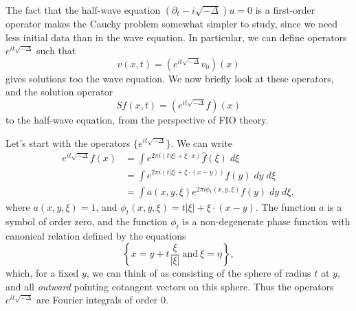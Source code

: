 \documentclass{article}
\theoremstyle{plain}
\theoremstyle{remark}
\theoremstyle{definition}
\begin{document}
The fact that the half-wave equation $(\partial_t - i \sqrt{-\Delta}) u = 0$ is a first-order operator makes the Cauchy problem somewhat simpler to study, since we need less initial data than in the wave equation. In particular, we can define operators $e^{it \sqrt{-\Delta}}$ such that
%
\[ v(x,t) = (e^{i t \sqrt{-\Delta}} v_0)(x) \]
%
gives solutions too the wave equation. We now briefly look at these operators, and the solution operator
%
\[ Sf(x,t) = (e^{i t \sqrt{-\Delta}} f)(x) \]
%
to the half-wave equation, from the perspective of FIO theory.

\begin{comment}

Fourier transform of e^{-|x|} is

	c_d (1 + |xi|^2)^{- (d+1) / 2}

Fourier transform of e^{- lambda |x|} for lambda > 0 is

	int e^{- lambda |x|} e^{-i xi * x} dx
	= c_d lambda^{-d} (1 + |xi|^2 / lambda^2)^{-(d+1)/2}

Can we now apply analytic continuation to conclude that
the Fourier transform of e^{-it |x|} is equal to

	c_d (it)^{-d} ( 1 + |xi|^2 / (it + 0)^2 )^{-(d+1)/2}

where we take the branch of the square root that is the analytic extension
away of the normal square root away, defined away from the imaginary axis.

Then for |xi| > t this quantity is equal to

	c_d i t^{-d} ( |xi|^2 / t^2 - 1 )^{-(d+1)/2}

e^{-i pi / 2}

sqrt( a e^{it} ) = sqrt(a) sqrt(e^{it/2})

\end{comment}

Let's start with the operators $\{ e^{it \sqrt{-\Delta}} \}$. We can write
%
\begin{align*}
	e^{i t \sqrt{-\Delta}} f(x) &= \int e^{2 \pi i (t |\xi| + \xi \cdot x)} \widehat{f}(\xi)\; d\xi\\
	&= \int e^{2 \pi i (t |\xi| + \xi \cdot (x - y))} f(y)\; dy\; d\xi\\
	&= \int a(x,y,\xi) e^{2 \pi i \phi_t(x,y,\xi)} f(y)\; dy\; d\xi,
\end{align*}
%
where $a(x,y,\xi) = 1$, and $\phi_t(x,y,\xi) = t |\xi| + \xi \cdot (x - y)$. The function $a$ is a symbol of order zero, and the function $\phi_t$ is a non-degenerate phase function with canonical relation defined by the equations
%
\[ \left\{ x = y + t \frac{\xi}{|\xi|}\ \text{and}\ \xi = \eta \right\}, \]
%
which, for a fixed $y$, we can think of as consisting of the sphere of radius $t$ at $y$, and all \emph{outward} pointing cotangent vectors on this sphere. Thus the operators $e^{it \sqrt{-\Delta}}$ are Fourier integrals of order $0$.
\end{document}
